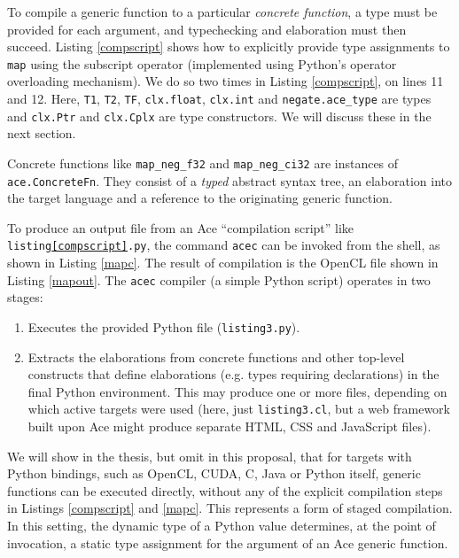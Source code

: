 To compile a generic function to a particular \emph{concrete function}, a type must be provided for each argument, and typechecking and elaboration must then succeed. Listing \ref{compscript} shows how to explicitly provide type assignments to \verb|map| using the subscript operator (implemented using Python's operator overloading mechanism). We do so two times in Listing \ref{compscript}, on lines 11 and 12. Here, \verb|T1|, \verb|T2|, \verb|TF|, \verb|clx.float|, \verb|clx.int| and \verb|negate.ace_type| are types and \verb|clx.Ptr| and \verb|clx.Cplx| are type constructors. We will discuss these in the next section.
 
Concrete functions like \verb|map_neg_f32| and \verb|map_neg_ci32| are instances of \verb|ace.ConcreteFn|. They consist of a \emph{typed} abstract syntax tree, an elaboration into the target language and a reference to the originating generic function. %

To produce an output file from an Ace ``compilation script'' like \verb|listing|\texttt{\ref{compscript}}\verb|.py|, the command \verb|acec| can be invoked from the shell, as shown in Listing \ref{mapc}. The result of compilation is the OpenCL file shown in Listing \ref{mapout}. The \verb|acec| compiler (a simple Python script) operates in two stages:
\begin{enumerate}
\item Executes the provided Python file (\verb|listing3.py|).
\item Extracts the elaborations from concrete functions and other top-level constructs that define elaborations (e.g. types requiring declarations) in the final Python environment.  This may produce one or more files, depending on which active targets were used (here, just \verb|listing3.cl|, but a web framework built upon Ace might produce separate HTML, CSS and JavaScript files).
\end{enumerate}

We will show in the thesis, but omit in this proposal, that for targets with Python bindings, such as OpenCL, CUDA, C, Java or Python itself, generic functions can be executed directly, without any of the explicit compilation steps in Listings \ref{compscript} and \ref{mapc}. This represents a form of staged compilation.  In this setting, the dynamic type of a Python value determines, at the point of invocation, a static type assignment for the argument of an Ace generic function. 


